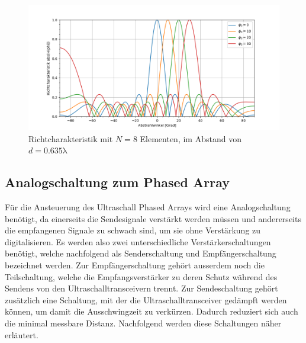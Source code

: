 \begin{figure}[htb]
\begin{center}
\includegraphics[width=\textwidth]{graphics/plot_hardware_characteristic_calc.png}
\end{center}
\caption{Richtcharakteristik mit $N = 8$ Elementen, im Abstand von $d = 0.635 \mathrm{\lambda}$} %
\label{fig:plot_hardware_characteristic_calc}
\end{figure}
%



\clearpage
\subsection{Analogschaltung zum Phased Array}\label{sec:analogschaltung_zum_phased_array}
Für die Ansteuerung des Ultraschall Phased Arrays wird eine Analogschaltung benötigt, da einerseits die Sendesignale verstärkt werden müssen und andererseits die empfangenen Signale zu schwach sind, um sie ohne Verstärkung zu digitalisieren. Es werden also zwei unterschiedliche Verstärkerschaltungen benötigt, welche nachfolgend als Senderschaltung und Empfängerschaltung bezeichnet werden. Zur Empfängerschaltung gehört ausserdem noch die Teilschaltung, welche die Empfangsverstärker zu deren Schutz während des Sendens von den Ultraschall\-trans\-ceivern trennt. Zur Sendeschaltung gehört zusätzlich eine Schaltung, mit der die Ultraschall\-trans\-ceiver gedämpft werden können, um damit die Ausschwingzeit zu verkürzen. Dadurch reduziert sich auch die minimal messbare Distanz. Nachfolgend werden diese Schaltungen näher erläutert.

